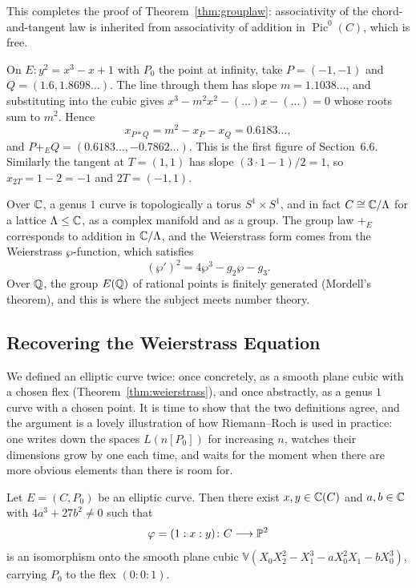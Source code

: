 \documentclass[a4paper]{scrartcl}
\newcommand{\V}{\mathbb{V}}
\DeclareMathOperator{\Pic}{Pic}
\begin{document}
This completes the proof of Theorem~\ref{thm:grouplaw}: associativity of the chord-and-tangent law is inherited from associativity of addition in $\Pic^0(C)$, which is free.

\begin{example}
	On $E \colon y^2 = x^3-x+1$ with $P_0$ the point at infinity, take $P = (-1,-1)$ and $Q = (1.6, 1.8698\ldots)$. The line through them has slope $m = 1.1038\ldots$, and substituting into the cubic gives $x^3 - m^2x^2 - (\ldots)x - (\ldots) = 0$ whose roots sum to $m^2$. Hence
	$$x_{P*Q} = m^2 - x_P - x_Q = 0.6183\ldots,$$
	and $P +_E Q = (0.6183\ldots, -0.7862\ldots)$. This is the first figure of Section~6.6. Similarly the tangent at $T = (1,1)$ has slope $(3\cdot 1 - 1)/2 = 1$, so $x_{2T} = 1 - 2 = -1$ and $2T = (-1,1)$.
\end{example}

\begin{remark}
	Over $\mathbb{C}$, a genus $1$ curve is topologically a torus $S^1\times S^1$, and in fact $C \cong \mathbb{C}/\Lambda$ for a lattice $\Lambda \leq \mathbb{C}$, as a complex manifold and as a group. The group law $+_E$ corresponds to addition in $\mathbb{C}/\Lambda$, and the Weierstrass form comes from the Weierstrass $\wp$-function, which satisfies
	$$(\wp')^2 = 4\wp^3 - g_2\wp - g_3.$$
	Over $\mathbb{Q}$, the group $E(\mathbb{Q})$ of rational points is finitely generated (Mordell's theorem), and this is where the subject meets number theory.
\end{remark}

\subsection{Recovering the Weierstrass Equation}

We defined an elliptic curve twice: once concretely, as a smooth plane cubic with a chosen flex (Theorem~\ref{thm:weierstrass}), and once abstractly, as a genus $1$ curve with a chosen point. It is time to show that the two definitions agree, and the argument is a lovely illustration of how Riemann--Roch is used in practice: one writes down the spaces $L(n[P_0])$ for increasing $n$, watches their dimensions grow by one each time, and waits for the moment when there are more obvious elements than there is room for.

\begin{theorem}\label{thm:g1weier}
	Let $E = (C,P_0)$ be an elliptic curve. Then there exist $x,y \in \mathbb{C}(C)$ and $a,b\in\mathbb{C}$ with $4a^3+27b^2 \neq 0$ such that
	$$\varphi = (1 : x : y) \colon C \longrightarrow \mathbb{P}^2$$
	is an isomorphism onto the smooth plane cubic $\V(X_0X_2^2 - X_1^3 - aX_0^2X_1 - bX_0^3)$, carrying $P_0$ to the flex $(0:0:1)$.
\end{theorem}
\end{document}
